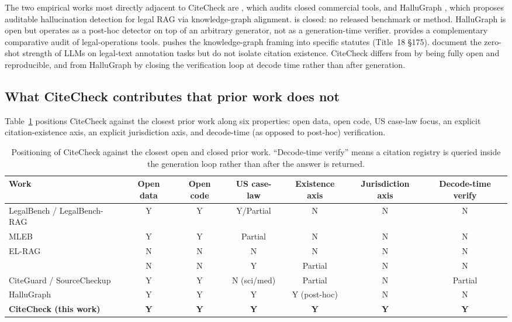 \documentclass[11pt]{article}
\begin{document}
The two empirical works most directly adjacent to CiteCheck are
\citet{magesh2025hallucination}, which audits closed commercial tools,
and HalluGraph \citep{noel2025hallugraph}, which proposes auditable
hallucination detection for legal RAG via knowledge-graph alignment.
\citet{magesh2025hallucination} is closed: no released benchmark or
method. HalluGraph is open but operates as a post-hoc detector on top
of an arbitrary generator, not as a generation-time verifier.
\citet{munir2025evaluating} provides a complementary comparative audit
of legal-operations tools. \citet{jha2025kglegal} pushes the
knowledge-graph framing into specific statutes (Title~18 \S 175).
\citet{savelka2023unreasonable} document the zero-shot strength of
LLMs on legal-text annotation tasks but do not isolate citation
existence. CiteCheck differs from \citet{magesh2025hallucination} by
being fully open and reproducible, and from HalluGraph by closing the
verification loop at decode time rather than after generation.

\subsection{What CiteCheck contributes that prior work does not}
\label{sec:related:positioning}

Table~\ref{tab:positioning} positions CiteCheck against the closest
prior work along six properties: open data, open code, US case-law
focus, an explicit citation-existence axis, an explicit jurisdiction
axis, and decode-time (as opposed to post-hoc) verification.

\begin{table}[t]
\centering
\small
\begin{tabular}{lcccccc}
\toprule
\textbf{Work} & \textbf{Open data} & \textbf{Open code} &
\textbf{US case-law} & \textbf{Existence axis} &
\textbf{Jurisdiction axis} & \textbf{Decode-time verify} \\
\midrule
LegalBench / LegalBench-RAG     & Y & Y & Y/Partial & N & N & N \\
MLEB                            & Y & Y & Partial   & N & N & N \\
EL-RAG                          & N & N & N         & N & N & N \\
\citet{magesh2025hallucination} & N & N & Y         & Partial & N & N \\
CiteGuard / SourceCheckup       & Y & Y & N (sci/med) & Partial & N & Partial \\
HalluGraph                      & Y & Y & Y         & Y (post-hoc) & N & N \\
\textbf{CiteCheck (this work)}  & \textbf{Y} & \textbf{Y} & \textbf{Y} &
                                  \textbf{Y} & \textbf{Y} & \textbf{Y} \\
\bottomrule
\end{tabular}
\caption{Positioning of CiteCheck against the closest open and closed
prior work. ``Decode-time verify'' means a citation registry is
queried inside the generation loop rather than after the answer is
returned.}
\label{tab:positioning}
\end{table}
\end{document}
